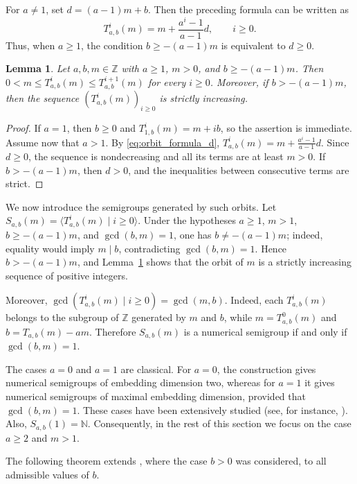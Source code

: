 \documentclass[12pt,a4paper]{amsart}
\newtheorem{lemma}[theorem]{Lemma}
\theoremstyle{definition}
\begin{document}
For $a\ne 1$, set $d=(a-1)m+b$. Then the preceding formula can be
written as
\begin{equation}\label{eq:orbit_formula_d}
T^i_{a,b}(m)=m+\frac{a^i-1}{a-1}d,\qquad i\ge 0.
\end{equation}
Thus, when $a\ge 1$, the condition $b\ge -(a-1)m$ is equivalent to
$d\ge 0$.

\begin{lemma}\label{lem:orbit_increasing}
Let $a,b,m\in\mathbb{Z}$ with $a\ge 1$, $m>0$, and
$b\ge -(a-1)m$. Then $0<m\le T^i_{a,b}(m)\le T^{i+1}_{a,b}(m)$ for
every $i\ge 0$. Moreover, if $b>-(a-1)m$, then the sequence
$(T^i_{a,b}(m))_{i\ge 0}$ is strictly increasing.
\end{lemma}

\begin{proof}
If $a=1$, then $b\ge 0$ and $T^i_{1,b}(m)=m+ib$, so the assertion is
immediate. Assume now that $a>1$. By \eqref{eq:orbit_formula_d},
$T^i_{a,b}(m)=m+\frac{a^i-1}{a-1}d$. Since $d\ge 0$, the sequence is
nondecreasing and all its terms are at least $m>0$. If
$b>-(a-1)m$, then $d>0$, and the inequalities between consecutive terms
are strict.
\end{proof}

We now introduce the semigroups generated by such orbits. Let
$S_{a,b}(m)=\langle T^i_{a,b}(m)\mid i\ge 0\rangle$. Under the
hypotheses $a\ge 1$, $m>1$, $b\ge -(a-1)m$, and $\gcd(b,m)=1$, one has
$b\ne -(a-1)m$; indeed, equality would imply $m\mid b$, contradicting
$\gcd(b,m)=1$. Hence $b>-(a-1)m$, and Lemma~\ref{lem:orbit_increasing}
shows that the orbit of $m$ is a strictly increasing sequence of
positive integers.

Moreover,
$\gcd(T^i_{a,b}(m)\mid i\ge 0)=\gcd(m,b)$. Indeed, each
$T^i_{a,b}(m)$ belongs to the subgroup of $\mathbb{Z}$ generated by
$m$ and $b$, while $m=T^0_{a,b}(m)$ and
$b=T_{a,b}(m)-am$. Therefore $S_{a,b}(m)$ is a numerical semigroup if
and only if $\gcd(b,m)=1$.

The cases $a=0$ and $a=1$ are classical. For $a=0$, the construction
gives numerical semigroups of embedding dimension two, whereas for
$a=1$ it gives numerical semigroups of maximal embedding dimension,
provided that $\gcd(b,m)=1$. These cases have been extensively studied
(see, for instance, \cite{libro}). Also, $S_{a,b}(1)=\mathbb{N}$.
Consequently, in the rest of this section we focus on the case
$a\ge 2$ and $m>1$.

The following theorem extends \cite[Theorem~3.1]{Ugo17}, where the case
$b>0$ was considered, to all admissible values of $b$.
\end{document}
